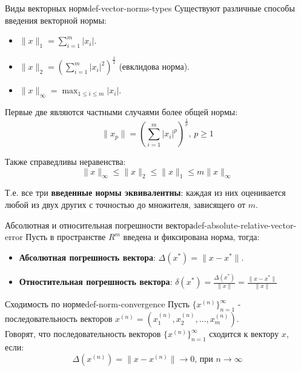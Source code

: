 \documentclass[14pt]{extarticle}
\begin{document}
    \begin{definition}{Виды векторных норм}{def-vector-norms-types}
        Существуют различные способы введения векторной нормы:
        \begin{itemize}
            \item $\|x\|_{1} = \sum_{i=1}^{m} |x_{i}|$.
            \item $\|x\|_{2} = (\sum_{i=1}^{m} {|x_{i}|}^{2})^{\frac{1}{2}}$ (евклидова норма).
            \item $\|x\|_{\infty} = \max_{1 \leq i \leq m} |x_{i}|$.
        \end{itemize}

        \vspace{\baselineskip}

        Первые две являются частными случаями более общей нормы:
        $$\|x_{p}\| = (\sum_{i=1}^{m} {|x_{i}|}^{p})^{\frac{1}{p}} \text{, } p \geq 1$$
    
        \vspace{\baselineskip}

        Также справедливы неравенства:
        $$\|x\|_{\infty} \leq \|x\|_{2} \leq \|x\|_{1} \leq m\|x\|_{\infty}$$

        Т.е. все три \textbf{введенные нормы эквивалентны}: каждая из них оценивается любой из двух других с точностью до множителя, зависящего от $m$.
    \end{definition}

    \begin{definition}{Абсолютная и относительная погрешности вектора}{def-absolute-relative-vector-error}
        Пусть в пространстве $R^{m}$ введена и фиксирована норма, тогда:
        \begin{itemize}
            \item \textbf{Абсолютная погрешность вектора}: $\Delta(x^{*}) = \|x - x^{*}\|$.
            \item \textbf{Отностительная погрешность вектора}: $\delta(x^{*}) = \frac{\Delta(x^{*})}{\|x\|} = \frac{\|x - x^{*}\|}{\|x\|}$
        \end{itemize}
    \end{definition}

    \begin{definition}{Сходимость по норме}{def-norm-convergence}
        Пусть $\{x^{(n)}\}_{n = 1}^{\infty}$ - последовательность векторов $x^{(n)} = (x_{1}^{(n)}, x_{2}^{(n)}, \ldots, x_{m}^{(n)})$.\\
        Говорят, что последовательность векторов $\{x^{(n)}\}_{n = 1}^{\infty}$ сходится к вектору $x$, если:
        $$\Delta(x^{(n)}) = \|x - x^{(n)}\| \to 0 \text{, при } n \to \infty$$
    \end{definition}
\end{document}
